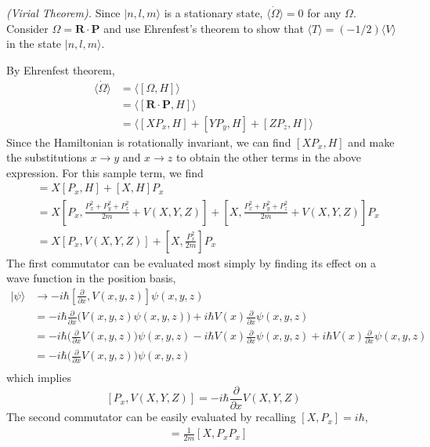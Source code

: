 \documentclass[../principles-of-quantum-mechanics.tex]{subfiles}
\begin{document}
\begin{questions}
	\question \textit{(Virial Theorem).} Since $|n, l, m\rangle$ is a stationary state, $\langle \dot{\Omega}\rangle = 0$ for any $\Omega$. Consider $\Omega = \mathbf{R}\cdot\mathbf{P}$ and use Ehrenfest's theorem to show that $\langle T\rangle = (-1/2)\langle V\rangle$ in the state $|n, l, m\rangle$.
	
	\begin{solution}
		By Ehrenfest theorem,
		\begin{align*}
			\langle \dot{\Omega}\rangle &= \langle [\Omega, H]\rangle \\
			&= \langle [\mathbf{R}\cdot\mathbf{P}, H]\rangle \\
			&= \langle [XP_x, H] + [YP_y, H] + [ZP_z, H]\rangle
		\end{align*}
		Since the Hamiltonian is rotationally invariant, we can find $[XP_x, H]$ and make the substitutions $x\to y$ and $x\to z$ to obtain the other terms in the above expression. For this sample term, we find
		\begin{align*}
			[XP_x, H] &= X[P_x, H] + [X, H]P_x \\
			&= X[P_x, \tfrac{P_x^2 + P_y^2 + P_z^2}{2m} + V(X, Y, Z)] + [X, \tfrac{P_x^2 + P_y^2 + P_z^2}{2m} + V(X, Y, Z)]P_x \\
			&= X[P_x, V(X, Y, Z)] + [X, \tfrac{P_x^2}{2m}]P_x
		\end{align*}
		The first commutator can be evaluated most simply by finding its effect on a wave function in the position basis,
		\begin{align*}
			[P_x, V(X, Y, Z)]|\psi\rangle &\to -i\hbar[\tfrac{\partial}{\partial x}, V(x, y, z)]\psi(x, y, z) \\
			&= -i\hbar\frac{\partial}{\partial x}\Big(V(x, y, z)\psi(x, y, z)\Big) + i\hbar V(x)\frac{\partial}{\partial x}\psi(x, y, z) \\
			&= -i\hbar\Big(\frac{\partial}{\partial x}V(x, y, z)\Big)\psi(x, y, z) - i\hbar V(x)\frac{\partial}{\partial x}\psi(x, y, z) + i\hbar V(x)\frac{\partial}{\partial x}\psi(x, y, z) \\
			&= -i\hbar\Big(\frac{\partial}{\partial x}V(x, y, z)\Big)\psi(x, y, z) \\
		\end{align*}
		which implies
		$$[P_x, V(X, Y, Z)] = -i\hbar\frac{\partial}{\partial x}V(X, Y, Z)$$
		The second commutator can be easily evaluated by recalling $[X, P_x] = i\hbar$,
		\begin{align*}
			[X, \tfrac{P_x^2}{2m}] &= \frac{1}{2m}[X, P_xP_x] \\

\end{align*}
\end{solution}
\end{questions}
\end{document}
